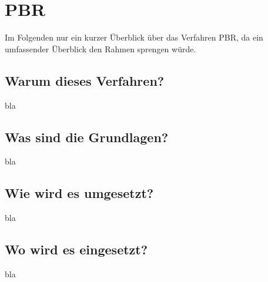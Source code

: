 \chapter{\acl{PBR}}
\label{chap:pbr}

Im Folgenden nur ein kurzer Überblick über das Verfahren \acf{PBR}, da ein umfassender Überblick den Rahmen sprengen würde.

\section{Warum dieses Verfahren?}
bla

\section{Was sind die Grundlagen?}
bla

\section{Wie wird es umgesetzt?}
bla

\section{Wo wird es eingesetzt?}
bla
